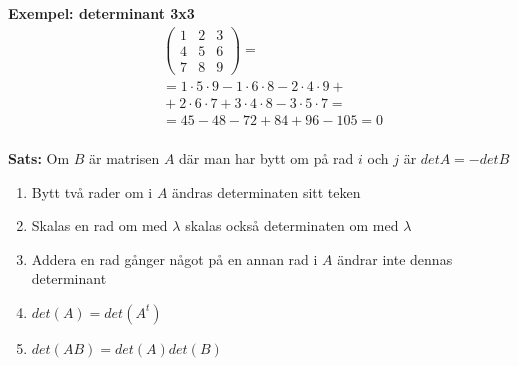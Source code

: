 \begin{multicols}{2}
\textbf{Exempel: determinant 3x3 }
\begin{align*}
  &\quad  
  \left(\begin{array}{ccc}
    1 & 2 & 3  \\
    4 & 5 & 6  \\
    7 & 8 & 9
  \end{array}\right) = \\
  &\quad  =1\cdot{5}\cdot{9}-1\cdot{6}\cdot{8}-2\cdot{4}\cdot{9}+ \\
  &\quad  +2\cdot{6}\cdot{7}+3\cdot{4}\cdot{8}-3\cdot{5}\cdot{7}= \\
  &\quad  =45-48-72+84+96-105=0 \\
\end{align*}

\textbf{Sats:}
Om $B$ är matrisen $A$ där man har bytt om på rad $i$ och $j$ är $detA = -detB$
\begin{enumerate}
  \item Bytt två rader om i $A$ ändras determinaten sitt teken
  \item Skalas en rad om med $\lambda$ skalas också determinaten om med $\lambda$
  \item Addera en rad gånger något på en annan rad i $A$ ändrar inte dennas determinant
  \item $det(A) = det(A^t)$
  \item $det(AB)=det(A)det(B)$
\end{enumerate}



\end{multicols}
